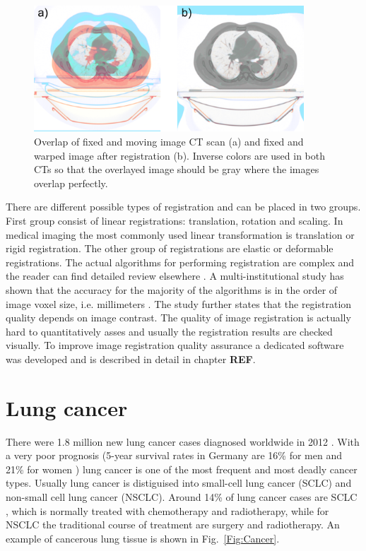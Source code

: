 \documentclass[type=dr, dr=rernat, accentcolor=tud7b,colorbacktitle, bigchapter, openright, twoside, 12pt ]{tudthesis}
\begin{document}
\begin{figure}[H]
\begin{center}
\includegraphics[width=0.9\textwidth]{./Images/RegistrationCompare.png}
\caption{Overlap of fixed and moving image CT scan (a) and fixed and warped image after registration (b). Inverse colors are used in both CTs so that the overlayed image should be gray
where the images overlap perfectly.}
\label{RegistrationCompare}
\end{center}
\end{figure}

There are different possible types of registration and can be placed in two groups. First group consist of linear registrations: translation, rotation and scaling. In medical imaging the most commonly used linear transformation 
is translation or rigid registration. The other group of registrations are elastic or deformable registrations. The actual algorithms for performing registration are complex and the reader can
find detailed review elsewhere \cite{Hill2001,Brock2006,Rietzel2006a}. A multi-institutional study has shown that the accuracy for the majority of the algorithms is in the order of image voxel
size, i.e. millimeters \cite{Brock2010}. The study further states that the registration quality depends on image contrast. The quality of image registration is actually hard to quantitatively
asses and usually the registration results are checked visually. To improve image registration quality assurance a dedicated software was developed and is described in detail in chapter \textbf{REF}.

\newpage




\section{Lung cancer}

There were 1.8 million new lung cancer cases diagnosed worldwide in 2012 \cite{Worldwide2012}. With a very poor prognosis (5-year survival rates in Germany are
16\% for men and 21\% for women \cite{Kaatsch2014}) lung cancer is one of the most frequent and most deadly cancer types. Usually lung cancer is distiguised
into small-cell lung cancer (SCLC) and non-small cell lung cancer (NSCLC). Around 14\% of lung cancer cases are SCLC \cite{Tsao2008}, which is normally treated with chemotherapy and radiotherapy, while for NSCLC the traditional course of treatment
are surgery and radiotherapy. An example of cancerous lung tissue is shown in Fig.~\ref{Fig:Cancer}.
\end{document}
